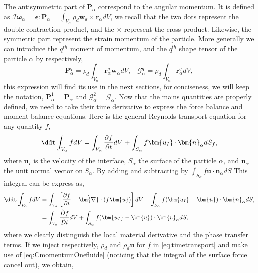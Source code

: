 The antisymmetric part of  $\bm{P}_\alpha$ correspond to the angular momentum. 
It is defined as $\bm{\mathcal{I}}\bm{\omega}_\alpha = \bm{\epsilon} : \bm{P}_\alpha =\int_{V_\alpha}\rho_d \bm{w}_\alpha \times \bm{r}_\alpha dV $, we recall that the two dots represent the double contraction product, and the $\times$ represent the cross product.
Likewise, the symmetric part represent the strain momentum of the particle.
More generally we can introduce the $q^{th}$ moment of momentum, and the $q^{th}$ shape tensor of the particle $\alpha$  by respectively,
\begin{equation}
    \bm{P}_\alpha^q 
    =  \rho_d\int_{V_\alpha} \bm{r}_\alpha^q \bm{w}_\alpha dV,\;\;\;
    \mathcal{G}_\alpha^q =  \rho_d\int_{V_\alpha} \bm{r}_\alpha^q dV,
    \label{eq:qthmoment}
\end{equation}
this expression will find its use in the next sections, for conciseness, we will keep the notation, $\bm{P}_\alpha^1 =\bm{P}_\alpha$ and $\mathcal{G}^2_\alpha = \mathcal{G}_\alpha$. 
Now that the mains quantities are properly defined, we need to take their time derivative to express the force balance and moment balance equations. 
Here is the general Reynolds transport equation for any quantity $f$, 
\begin{equation}
    \ddt \int_{V_\alpha} f dV 
    = \int_{V_\alpha} \frac{\partial f}{\partial t}dV 
    + \int_{S_\alpha} f \bm{u_I}\cdot \bm{n}_\alpha d S_f,
\end{equation}
where $\bm{u}_I$ is the velocity of the interface, $S_\alpha$ the surface of the particle $\alpha$, and $\bm{n}_\alpha$ the unit normal vector on $S_\alpha$. 
By adding and subtracting by $\int_{S_\alpha} f \bm{u}\cdot \bm{n}_\alpha dS$ This integral can be express as,
\begin{align}
    \label{eq:timetransport}
    \ddt \int_{V_\alpha} f dV &
    = \int_{V_\alpha}\left[ \frac{\partial f}{\partial t} + \hat{\bm{\nabla}}\cdot\left(f\bm{u}\right) \right]dV + \int_{S_\alpha} f (\bm{u_I}-\bm{u})\cdot \bm{n}_\alpha d S,\\
    &= \int_{V_\alpha} \frac{\hat{D} f}{\hat{D} t} dV + \int_{S_\alpha} f (\bm{u_I}-\bm{u})\cdot \bm{n}_\alpha d S,\\
\end{align}
where we clearly distinguish the local material derivative and the phase transfer terms.
If we inject respectively, $\rho_d$ and $\rho_d \bm{u}$ for $f$ in \ref{eq:timetransport} and make use of \ref{eq:CmomentumOnefluide} (noticing that the integral of the surface force cancel out), we obtain, 
